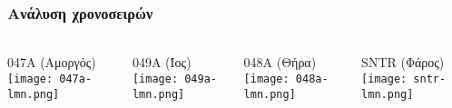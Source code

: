 \begin{frame}
  \frametitle{Ανάλυση χρονοσειρών}
  \framesubtitle{}
  \label{}
  \vskip-1cm
  \begin{columns}[T]
    \begin{column}{.25\textwidth}
      \begin{center}
      {\scriptsize 047A (Αμοργός)}
        \texttt{[image: 047a-lmn.png]}
      \end{center}  
    \end{column}
    \begin{column}{.25\textwidth}
      \begin{center}
       {\scriptsize 049A (Ίος)}
        \texttt{[image: 049a-lmn.png]}
      \end{center}       
    \end{column}
  \begin{column}{.25\textwidth}
      \begin{center}
       {\scriptsize 048A (Θήρα)}
        \texttt{[image: 048a-lmn.png]}
      \end{center}  
    \end{column}
    \begin{column}{.25\textwidth}
      \begin{center}
       {\scriptsize SNTR (Φάρος)}
        \texttt{[image: sntr-lmn.png]}
      \end{center}       
    \end{column}
  \end{columns}  
  
\end{frame}
\note{}

\note{}

